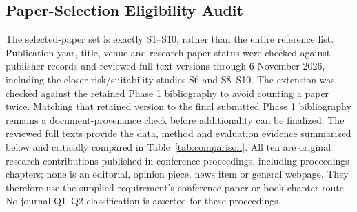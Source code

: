 \documentclass[11pt,a4paper]{article}
\begin{document}
\subsection*{Paper-Selection Eligibility Audit}
The selected-paper set is exactly S1--S10, rather than the entire reference
list. Publication year, title, venue and research-paper status were checked
against publisher records and reviewed full-text versions through
6 November 2026, including the closer risk/suitability studies S6 and S8--S10.
The extension was checked
against the retained Phase 1 bibliography to avoid counting a paper twice.
Matching that retained version to the final submitted Phase 1 bibliography
remains a document-provenance check before additionality can be finalized.
The reviewed full texts provide the data, method and evaluation evidence
summarized below and critically compared in Table~\ref{tab:comparison}.
All ten are original research contributions published in conference
proceedings, including proceedings chapters; none is an editorial, opinion
piece, news item or general webpage. They therefore use the supplied
requirement's conference-paper or book-chapter route. No journal Q1--Q2
classification is asserted for these proceedings.
\end{document}

